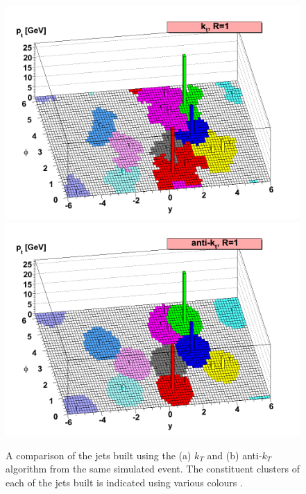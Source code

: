  \begin{figure}[!ht]
  \captionsetup[subfigure]{aboveskip=-5pt,justification=centering}
  \begin{center}
     {
      \includegraphics[width=0.45\linewidth, angle=0]{figs/Objects/jets_reco_shapes_kt.png}
    }%
     {
      \includegraphics[width=0.45\linewidth, angle=0]{figs/Objects/jets_reco_shapes_akt.png}
    }

  \end{center}
  \caption[A comparison of the jets built using the $k_T$ and anti-$k_T$ algorithm.]
          {A comparison of the jets built using the (a) $k_T$ and (b) anti-$k_T$ algorithm from the same simulated event.
            The constituent clusters of each of the jets built is indicated using various colours \cite{obj-jets_reco_akt}.}
  \label{fig:obj-jets_reco_shapes}
\end{figure}

